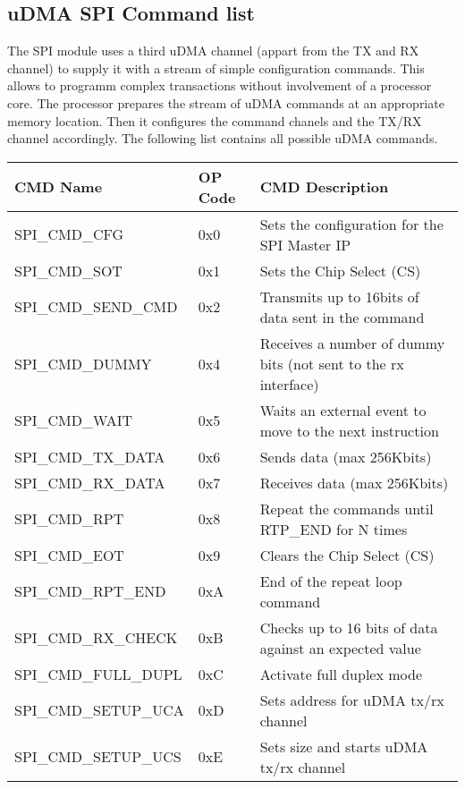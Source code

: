 \subsection{uDMA SPI Command list}
The SPI module uses a third uDMA channel (appart from the TX and RX channel) to
supply it with a stream of simple configuration commands.
This allows to programm complex transactions without involvement of a processor
core.
The processor prepares the stream of uDMA commands at an appropriate memory
location.
Then it configures the command chanels and the TX/RX channel accordingly.
The following list contains all possible uDMA commands.
{\small
  \begin{tabularx}{\textwidth}{|l|l|l|}
      \hline
      \textbf{CMD Name} & \textbf{OP Code}  & \textbf{CMD Description} \\
      \hline
      SPI\_CMD\_CFG       	& 0x0 & Sets the configuration for the SPI Master IP \\
      SPI\_CMD\_SOT       	& 0x1 & Sets the Chip Select (CS) \\
      SPI\_CMD\_SEND\_CMD  	& 0x2 & Transmits up to 16bits of data sent in the command \\
      SPI\_CMD\_DUMMY     	& 0x4 & Receives a number of dummy bits (not sent to the rx interface) \\
      SPI\_CMD\_WAIT      	& 0x5 & Waits an external event to move to the next instruction \\
      SPI\_CMD\_TX\_DATA   	& 0x6 & Sends data (max 256Kbits) \\
      SPI\_CMD\_RX\_DATA   	& 0x7 & Receives data (max 256Kbits) \\
      SPI\_CMD\_RPT       	& 0x8 & Repeat the commands until RTP\_END for N times \\
      SPI\_CMD\_EOT       	& 0x9 & Clears the Chip Select (CS) \\
      SPI\_CMD\_RPT\_END   	& 0xA & End of the repeat loop command \\
      SPI\_CMD\_RX\_CHECK  	& 0xB & Checks up to 16 bits of data against an expected value \\
      SPI\_CMD\_FULL\_DUPL 	& 0xC & Activate full duplex mode \\
      SPI\_CMD\_SETUP\_UCA 	& 0xD & Sets address for uDMA tx/rx channel \\
      SPI\_CMD\_SETUP\_UCS 	& 0xE & Sets size and starts uDMA tx/rx channel \\
      \hline
  \end{tabularx}
}

